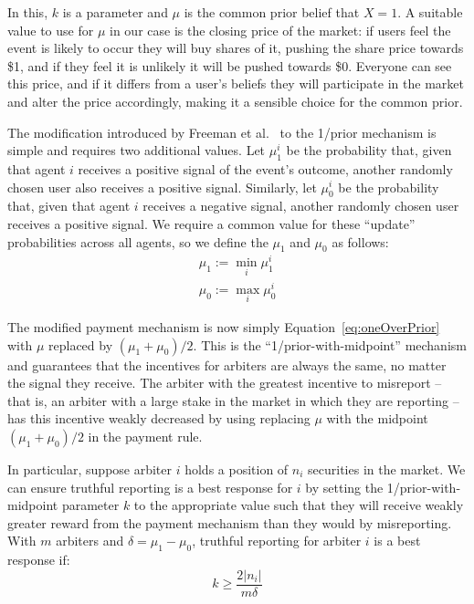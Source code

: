 In this, $k$ is a parameter and $\mu$ is the common prior belief that $X=1$. A
suitable value to use for $\mu$ in our case is the closing price of the market:
if users feel the event is likely to occur they will buy shares of it, pushing
the share price towards \$1, and if they feel it is unlikely it will be pushed
towards \$0. Everyone can see this price, and if it differs from a user's
beliefs they will participate in the market and alter the price accordingly,
making it a sensible choice for the common prior.

The modification introduced by Freeman et al.~\cite{Freeman2017} to the 1/prior
mechanism is simple and requires two additional values. Let $\mu_1^i$ be the
probability that, given that agent $i$ receives a positive signal of the
event's outcome, another randomly chosen user also receives a positive signal.
Similarly, let $\mu_0^i$ be the probability that, given that agent $i$ receives
a negative signal, another randomly chosen user receives a positive signal. We
require a common value for these ``update'' probabilities across all agents, so
we define the $\mu_1$ and $\mu_0$ as follows:
%
\begin{equation} \begin{gathered} \mu_1 := \min_i \mu_1^i \\ \mu_0 := \max_i
\mu_0^i \end{gathered} \end{equation}

The modified payment mechanism is now simply Equation~\ref{eq:oneOverPrior}
with $\mu$ replaced by $(\mu_1 + \mu_0)/2$. This is the
``1/prior-with-midpoint'' mechanism and guarantees that the incentives for
arbiters are always the same, no matter the signal they receive. The arbiter
with the greatest incentive to misreport -- that is, an arbiter with a large
stake in the market in which they are reporting -- has this incentive weakly
decreased by using replacing $\mu$ with the midpoint $(\mu_1 + \mu_0)/2$ in the
payment rule.

In particular, suppose arbiter $i$ holds a position of $n_i$ securities in the
market. We can ensure truthful reporting is a best response for $i$ by setting
the 1/prior-with-midpoint parameter $k$ to the appropriate value such that they
will receive weakly greater reward from the payment mechanism than they would
by misreporting. With $m$ arbiters and $\delta = \mu_1 - \mu_0$, truthful
reporting for arbiter $i$ is a best response if:
%
\begin{equation}
	\label{eq:kBoundN}
	k \ge \frac{2 |n_i|}{m \delta}
\end{equation}

